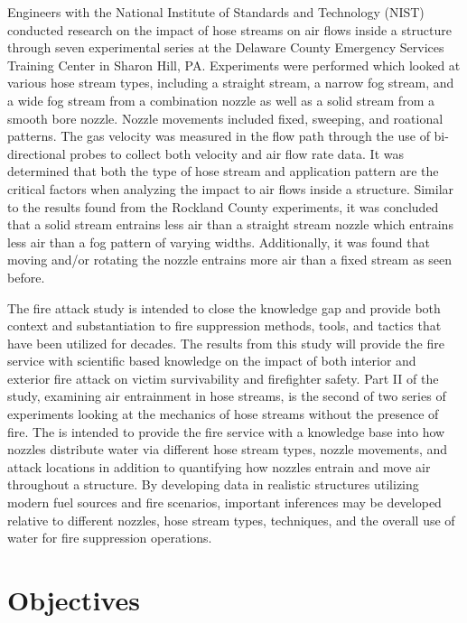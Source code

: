 \documentclass[12pt,oneside]{book}
\begin{document}
Engineers with the National Institute of Standards and Technology (NIST) conducted research on the impact of hose streams on air flows inside a structure through seven experimental series at the Delaware County Emergency Services Training Center in Sharon Hill, PA. Experiments were performed which looked at various hose stream types, including a straight stream, a narrow fog stream, and a wide fog stream from a combination nozzle as well as a solid stream from a smooth bore nozzle. Nozzle movements included fixed, sweeping, and roational patterns. The gas velocity was measured in the flow path through the use of bi-directional probes to collect both velocity and air flow rate data. It was determined that both the type of hose stream and application pattern are the critical factors when analyzing the impact to air flows inside a structure. Similar to the results found from the Rockland County experiments, it was concluded that a solid stream entrains less air than a straight stream nozzle which entrains less air than a fog pattern of varying widths. Additionally, it was found that moving and/or rotating the nozzle entrains more air than a fixed stream as seen before. 

The fire attack study is intended to close the knowledge gap and provide both context and substantiation to fire suppression methods, tools, and tactics that have been utilized for decades. The results from this study will provide the fire service with scientific based knowledge on the impact of both interior and exterior fire attack on victim survivability and firefighter safety. Part II of the study, examining air entrainment in hose streams, is the second of two series of experiments looking at the mechanics of hose streams without the presence of fire. The is intended to provide the fire service with a knowledge base into how nozzles distribute water via different hose stream types, nozzle movements, and attack locations in addition to quantifying how nozzles entrain and move air throughout a structure. By developing data in realistic structures utilizing modern fuel sources and fire scenarios, important inferences may be developed relative to different nozzles, hose stream types, techniques, and the overall use of water for fire suppression operations.

\clearpage

\chapter{Objectives}
\end{document}

